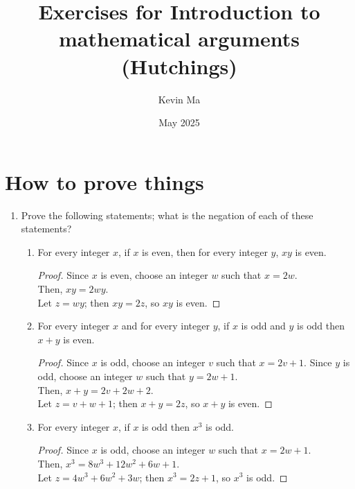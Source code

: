 \documentclass{article}
\title{Exercises for Introduction to mathematical arguments (Hutchings)}
\author{Kevin Ma}
\date{May 2025}
\begin{document}
\maketitle

\setcounter{section}{1}

\section{How to prove things}

\begin{enumerate}
    \item Prove the following statements; what is the negation of each of these statements?
    \begin{enumerate}
        \item For every integer $x$, if $x$ is even, then for every integer $y$, $xy$ is even.
        
        \begin{proof}
            Since $x$ is even, choose an integer $w$ such that $x = 2w$. \\
            Then, $xy = 2wy$. \\
            Let $z=wy$; then $xy=2z$, so $xy$ is even.
        \end{proof}
        
        \item For every integer $x$ and for every integer $y$, if $x$ is odd and $y$ is odd then $x + y$ is even.
        
        \begin{proof}
            Since $x$ is odd, choose an integer $v$ such that $x=2v+1$.
            Since $y$ is odd, choose an integer $w$ such that $y=2w+1$. \\
            Then, $x+y=2v+2w+2$. \\
            Let $z=v+w+1$; then $x+y=2z$, so $x+y$ is even.
        \end{proof}
        
        \item For every integer $x$, if $x$ is odd then $x^3$ is odd.
        
        \begin{proof}
            Since $x$ is odd, choose an integer $w$ such that $x=2w+1$. \\
            Then, $x^3 = 8w^3+12w^2+6w+1$. \\
            Let $z=4w^3+6w^2+3w$; then $x^3=2z+1$, so $x^3$ is odd.
        \end{proof}


\end{enumerate}
\end{enumerate}
\end{document}

